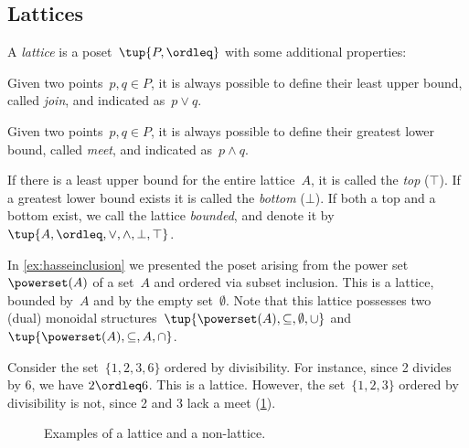 \subsection{Lattices}
\begin{definition}[Lattice]
\label{def:lattice}
A \emph{lattice} is a poset~$\tup{P, \ordleq}$ with some additional properties:
\begin{compactenum}
    \item Given two points~$p, q \in P$, it is always possible to define their least upper bound, called \emph{join}, and indicated as~$p \vee q$.
    \item Given two points~$p, q \in P$, it is always possible to define their greatest lower bound, called \emph{meet}, and indicated as~$p \wedge q$.
\end{compactenum}
\end{definition}

\begin{remark}
If there is a least upper bound for the entire lattice~$A$, it is called
the \emph{top} ($\top$). If a greatest lower bound exists it is called the \emph{bottom} ($\bot$). If both a top and a bottom exist, we call the lattice \emph{bounded}, and denote it by~$\tup{A,\ordleq,\vee,\wedge,\bot,\top}$.
\end{remark}

\begin{example}
    In \cref{ex:hasseinclusion} we presented the poset arising from the power set~$\powerset(A)$ of a set~$A$ and ordered via subset inclusion. This is a lattice, bounded by~$A$ and by the empty set~$\emptyset$. Note that this lattice possesses two (dual) monoidal structures~$\tup{\powerset(A),\subseteq,\emptyset,\cup}$ and~$\tup{\powerset(A),\subseteq,A,\cap}$.
\end{example}

\begin{example}
Consider the set~$\{1,2,3,6\}$ ordered by divisibility. For instance, since 2 divides by 6, we have $2\ordleq 6$. This is a lattice. However, the set~$\{1,2,3\}$ ordered by divisibility is not, since 2 and 3 lack a meet (\cref{fig:exlattice}).
\begin{figure}[h!]
\begin{center}
\end{center}
\caption{Examples of a lattice and a non-lattice. \label{fig:exlattice}}
\end{figure}
\end{example}